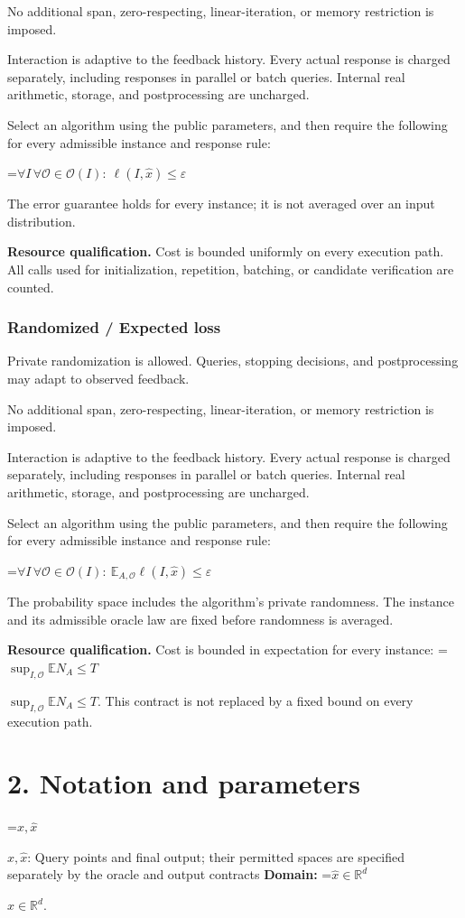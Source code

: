 \documentclass[10pt,a4paper]{article}
\newcommand{\AtlasMath}[1]{\par\begingroup\centering\setbox0=\hbox{$\displaystyle #1$}\ifdim\wd0>1.4\linewidth\typeout{ATLAS WIDE FORMULA: \the\wd0}\fi\ifdim\wd0>\linewidth\resizebox{\linewidth}{!}{\box0}\else\box0\fi\par\endgroup}
\newcommand{\AtlasInlineMath}[1]{\begingroup\setbox0=\hbox{$#1$}\ifdim\wd0>.4\linewidth\endgroup\AtlasMath{#1}\else\endgroup$#1$\fi}
\begin{document}
No additional span, zero-respecting, linear-iteration, or memory restriction is imposed.

Interaction is adaptive to the feedback history. Every actual response is charged separately, including responses in parallel or batch queries. Internal real arithmetic, storage, and postprocessing are uncharged.

Select an algorithm using the public parameters, and then require the following for every admissible instance and response rule:


\AtlasMath{\forall I\,\forall\mathcal{O}\in\mathcal{O}(I):\ \ell(I,\widehat{x})\le\varepsilon}


The error guarantee holds for every instance; it is not averaged over an input distribution.

\textbf{Resource qualification.} Cost is bounded uniformly on every execution path. All calls used for initialization, repetition, batching, or candidate verification are counted.

\subsubsection{Randomized / Expected loss}
Private randomization is allowed. Queries, stopping decisions, and postprocessing may adapt to observed feedback.

No additional span, zero-respecting, linear-iteration, or memory restriction is imposed.

Interaction is adaptive to the feedback history. Every actual response is charged separately, including responses in parallel or batch queries. Internal real arithmetic, storage, and postprocessing are uncharged.

Select an algorithm using the public parameters, and then require the following for every admissible instance and response rule:


\AtlasMath{\forall I\,\forall\mathcal{O}\in\mathcal{O}(I):\ \mathbb{E}_{A,\mathcal{O}}\ell(I,\widehat{x})\le\varepsilon}


The probability space includes the algorithm's private randomness. The instance and its admissible oracle law are fixed before randomness is averaged.

\textbf{Resource qualification.} Cost is bounded in expectation for every instance: \AtlasInlineMath{\sup_{I,\mathcal O}\mathbb E N_A\le T}. This contract is not replaced by a fixed bound on every execution path.

\section{2. Notation and parameters}
\AtlasInlineMath{x,\widehat{x}}: Query points and final output; their permitted spaces are specified separately by the oracle and output contracts \textbf{Domain:} \AtlasInlineMath{\widehat{x}\in \mathbb{R}^d}.
\end{document}

